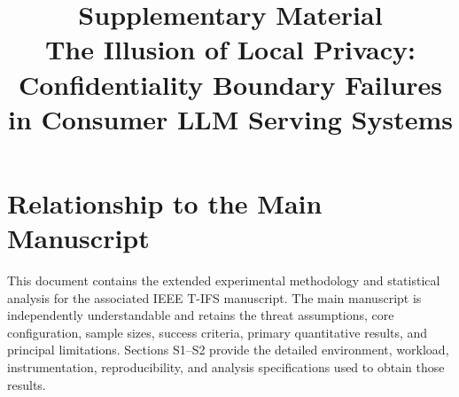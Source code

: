 \documentclass[journal,tifs]{IEEEtran}
\begin{document}
\title{Supplementary Material\\
The Illusion of Local Privacy: Confidentiality Boundary Failures in
Consumer LLM Serving Systems}
\author{}
\maketitle

\section*{Relationship to the Main Manuscript}
This document contains the extended experimental methodology and statistical
analysis for the associated IEEE T-IFS manuscript. The main manuscript is
independently understandable and retains the threat assumptions, core
configuration, sample sizes, success criteria, primary quantitative results,
and principal limitations. Sections S1--S2 provide the detailed environment,
workload, instrumentation, reproducibility, and analysis specifications used
to obtain those results.





\end{document}
